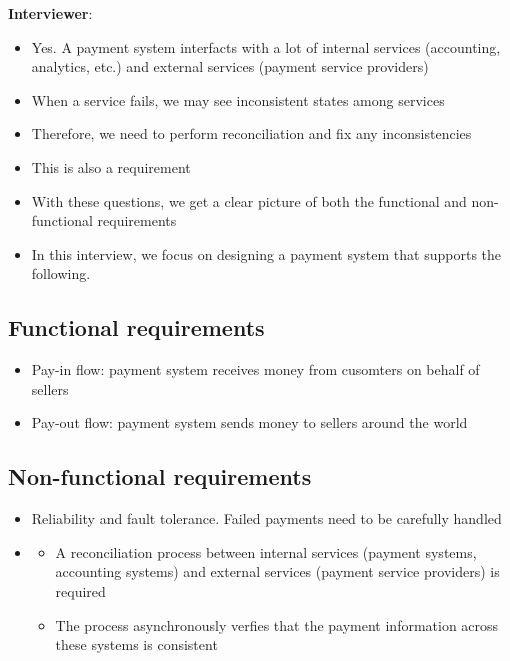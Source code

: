 \documentclass{report}
\theoremstyle{definition}
\let\oldsubsection\subsection
\renewcommand{\subsection}{\oldsubsection*}
\begin{document}
\begin{enumerate}
\textbf{Interviewer}:

\begin{itemize}
\item
Yes. A payment system interfacts with a lot of internal services (accounting, analytics, etc.) and external services (payment service providers)
\item
When a service fails, we may see inconsistent states among services
\item
Therefore, we need to perform reconciliation and fix any inconsistencies
\item
This is also a requirement
\item
With these questions, we get a clear picture of both the functional and non-functional requirements
\item
In this interview, we focus on designing a payment system that supports the following.
\end{itemize}
\end{enumerate}

\subsection{Functional requirements}

\begin{itemize}
\item
Pay-in flow: payment system receives money from cusomters on behalf of sellers
\item
Pay-out flow: payment system sends money to sellers around the world
\end{itemize}

\subsection{Non-functional requirements}

\begin{itemize}
\item
Reliability and fault tolerance. Failed payments need to be carefully handled
\item

\begin{itemize}
\item
A reconciliation process between internal services (payment systems, accounting systems) and external services (payment service providers) is required
\item
The process asynchronously verfies that the payment information across these systems is consistent
\end{itemize}
\end{itemize}
\end{document}
